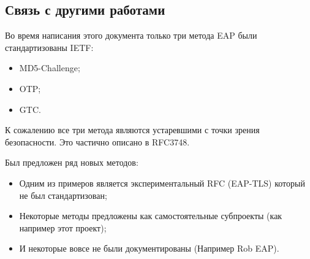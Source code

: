 \subsection{Связь с другими работами}

Во время написания этого документа только три метода EAP были стандартизованы IETF:

\begin{itemize}
\item MD5-Challenge;
\item OTP;
\item GTC.
\end{itemize}

К сожалению все три метода являются устаревшими с точки зрения безопасности. Это частично описано в RFC3748.

Был предложен ряд новых методов:

\begin{itemize}
\item Одним из примеров является экспериментальный RFC (EAP-TLS) который не был стандартизован;
\item Некоторые методы предложены как самостоятельные субпроекты (как например этот проект);
\item И некоторые вовсе не были документированы (Например Rob EAP).
\end{itemize}
